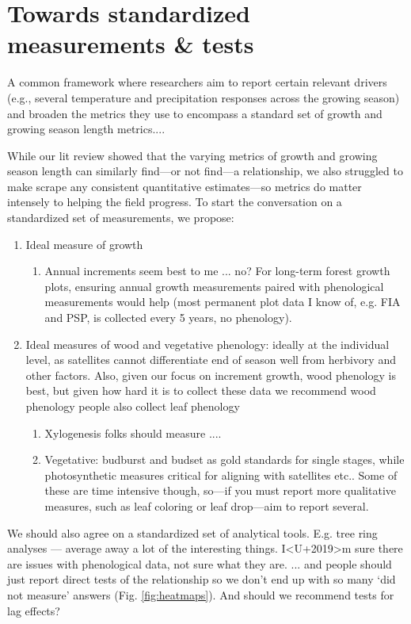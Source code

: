 \documentclass[11pt]{article}
\begin{document}
\section*{Towards standardized measurements \& tests}

 A common framework where researchers aim to report certain relevant drivers (e.g., several temperature and precipitation responses across the growing season) and broaden the metrics they use to encompass a standard set of growth and growing season length metrics....

While our lit review showed that the varying metrics of growth and growing season length can similarly find---or not find---a relationship, we also struggled to make scrape any consistent quantitative estimates---so metrics do matter intensely to helping the field progress. To start the conversation on a standardized set of measurements, we propose:
\begin{enumerate}
\item Ideal measure of growth
\begin{enumerate}
\item Annual increments seem best to me ... no? For long-term forest growth plots, ensuring annual growth measurements paired with phenological measurements would help (most permanent plot data I know of, e.g. FIA and PSP, is collected every 5 years, no phenology). 
\end{enumerate}
\item Ideal measures of wood and vegetative phenology: ideally at the individual level, as satellites cannot differentiate end of season well from herbivory and other factors. Also, given our focus on increment growth, wood phenology is best, but given how hard it is to collect these data we recommend wood phenology people also collect leaf phenology
\begin{enumerate}
\item Xylogenesis folks should measure ....
\item Vegetative: budburst and budset as gold standards for single stages, while photosynthetic measures critical for aligning with satellites etc.. Some of these are time intensive though, so---if you must report more qualitative measures, such as leaf coloring or leaf drop---aim to report several.  
\end{enumerate}
\end{enumerate}

We should also agree on a standardized set of analytical tools. E.g. tree ring analyses --- average away a lot of the interesting things. I<U+2019>m sure there are issues with phenological data, not sure what they are. ... and people should just report direct tests of the relationship so we don't end up with so many `did not measure' answers (Fig. \ref{fig:heatmaps}). And should we recommend tests for lag effects?
\end{document}
